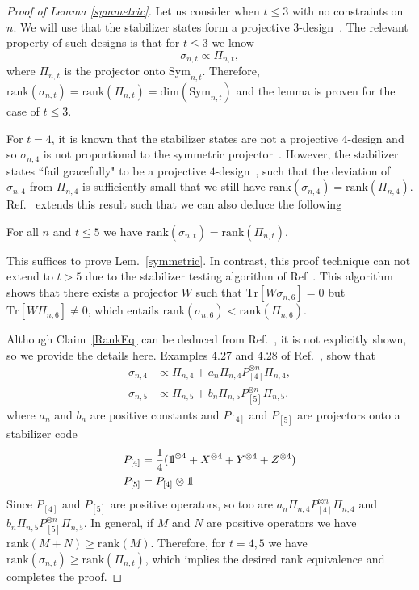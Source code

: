 \begin{proof}[Proof of Lemma \ref{symmetric}]
Let us consider when $t \leq 3$ with no constraints on $n$.  We will use that the stabilizer states form a projective $3$-design~\cite{Webb16,kueng15,zhu16}.  The relevant property of such designs is that for $t \leq 3$ we know
\begin{equation}
	\sigma_{n,t} \propto \Pi_{n,t} ,
\end{equation}
where $\Pi_{n,t}$ is the projector onto $\mathrm{Sym}_{n,t}$.  Therefore, $\mathrm{rank}( \sigma_{n,t} )=\mathrm{rank}( \Pi_{n,t} )  =\mathrm{dim}( \mathrm{Sym}_{n,t}  )$ and the lemma is proven for  the case of $t \leq 3$.

For $t=4$, it is known that the stabilizer states are not a projective $4$-design and so $\sigma_{n,4}$ is not proportional to the symmetric projector~\cite{zhu16}.  However, the stabilizer states ``fail gracefully" to be a projective $4$-design~\cite{zhu16}, such that the deviation of $\sigma_{n,4}$ from $\Pi_{n,4}$ is sufficiently small that we still have $\mathrm{rank}(\sigma_{n,4})=\mathrm{rank}(\Pi_{n,4})$. Ref.~\cite{gross2017schur} extends this result such that we can also deduce the following
\begin{claim}
	\label{RankEq}
	For all $n$ and $t \leq 5$ we have  $\mathrm{rank}(\sigma_{n,t})=\mathrm{rank}(\Pi_{n,t})$.
\end{claim}	
This suffices to prove Lem.~\ref{symmetric}.  In contrast, this proof technique can not extend to $t>5$ due to the stabilizer testing algorithm of Ref~\cite{gross2017schur}. This algorithm shows that there exists a projector $W$ such that $\mathrm{Tr}[W\sigma_{n,6} ]=0$ but  $\mathrm{Tr}[W\Pi_{n,6}] \neq 0$, which entails $\mathrm{rank}(\sigma_{n,6})<\mathrm{rank}(\Pi_{n,6})$.    

Although Claim~\ref{RankEq} can be deduced from Ref.~\cite{gross2017schur}, it is not explicitly shown, so we provide the details here.  Examples 4.27 and 4.28 of Ref.~\cite{gross2017schur},  show that
\begin{align}
	\sigma_{n,4} & \propto   \Pi_{n,4}  + a_{n}\Pi_{n,4}  P_{[4]}^{\otimes n} \Pi_{n,4} , \\ \nonumber 
	\sigma_{n,5} & \propto   \Pi_{n,5}  + b_{n}\Pi_{n,5}  P_{[5]}^{\otimes n} \Pi_{n,5} .
\end{align}
where $a_{n}$ and $b_n$ are positive constants and $P_{[4]}$ and $P_{[5]}$ are projectors onto a stabilizer code 
\begin{align}
	P_{[4]} & = \frac{1}{4}( \id^{\otimes 4} + X^{\otimes 4} + Y^{\otimes 4} + Z^{\otimes 4})  \\ \nonumber
	P_{[5]} & = P_{[4]} \otimes \id 
\end{align}
Since $P_{[4]}$ and $P_{[5]}$ are positive operators, so too are $a_n\Pi_{n,4} P_{[4]}^{\otimes n} \Pi_{n,4}$ and $b_n\Pi_{n,5} P_{[5]}^{\otimes n} \Pi_{n,5}$.  In general, if $M$ and $N$ are positive operators we have $\mathrm{rank}(M+N)\geq \mathrm{rank}(M)$.  Therefore, for $t=4, 5$ we have $\mathrm{rank}(	\sigma_{n,t})\geq \mathrm{rank}( \Pi_{n,t})$, which implies the desired rank equivalence and completes the proof. \end{proof}

